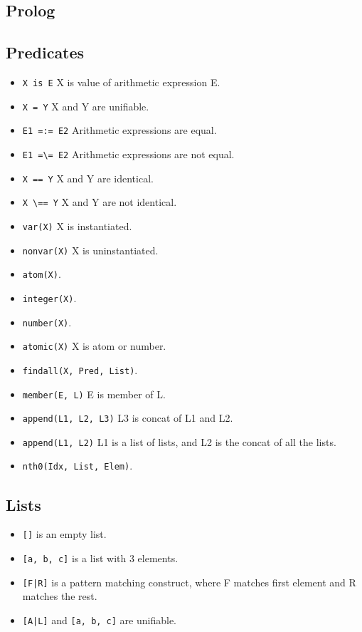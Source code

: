 \documentclass[landscape, letterpaper]{extarticle}
\theoremstyle{definition}
\begin{document}
\begin{multicols}{3}
    \section*{Prolog}
    \subsection*{Predicates}
    \begin{itemize}[noitemsep,nolistsep]
        \item \verb|X is E| X is value of arithmetic expression E.
        \item \verb|X = Y| X and Y are unifiable.
        \item \verb|E1 =:= E2| Arithmetic expressions are equal.
        \item \verb|E1 =\= E2| Arithmetic expressions are not equal.
        \item \verb|X == Y| X and Y are identical.
        \item \verb|X \== Y| X and Y are not identical.
        \item \verb|var(X)| X is instantiated.
        \item \verb|nonvar(X)| X is uninstantiated.
        \item \verb|atom(X)|.
        \item \verb|integer(X)|.
        \item \verb|number(X)|.
        \item \verb|atomic(X)| X is atom or number.
        \item \verb|findall(X, Pred, List)|.
        \item \verb|member(E, L)| E is member of L.
        \item \verb|append(L1, L2, L3)| L3 is concat of L1 and L2.
        \item \verb|append(L1, L2)| L1 is a list of lists, and L2 is the concat of all the lists.
        \item \verb|nth0(Idx, List, Elem)|.
    \end{itemize}
    \subsection*{Lists}
    \begin{itemize}[noitemsep,nolistsep]
        \item \verb|[]| is an empty list.
        \item \verb|[a, b, c]| is a list with 3 elements.
        \item \verb![F|R]! is a pattern matching construct, where F matches first element and R matches the rest.
        \item \verb![A|L]! and \verb![a, b, c]! are unifiable.
    \end{itemize}

\end{multicols}
\end{document}
